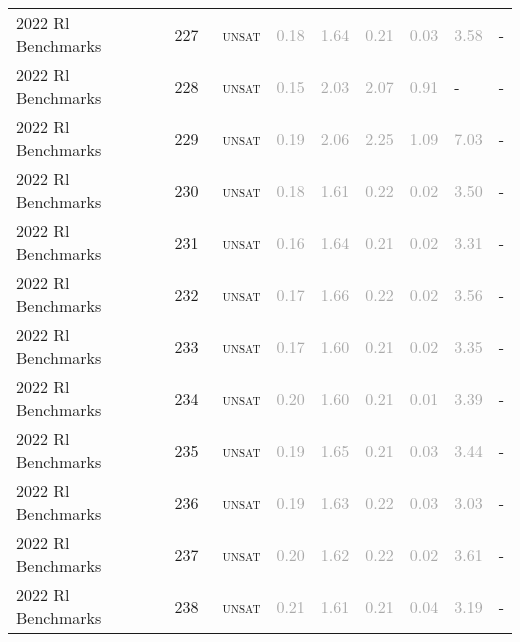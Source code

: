 \begin{center}
{\begin{longtable}{@{}lllllllll@{}}
2022 Rl Benchmarks & 227 & ~\textsc{unsat} & \textcolor{darkgray}{0.18} & \textcolor{darkgray}{1.64} & \textcolor{darkgray}{0.21} & \textcolor{darkgray}{0.03} & \textcolor{darkgray}{3.58} & - \\
2022 Rl Benchmarks & 228 & ~\textsc{unsat} & \textcolor{darkgray}{0.15} & \textcolor{darkgray}{2.03} & \textcolor{darkgray}{2.07} & \textcolor{darkgray}{0.91} & - & - \\
2022 Rl Benchmarks & 229 & ~\textsc{unsat} & \textcolor{darkgray}{0.19} & \textcolor{darkgray}{2.06} & \textcolor{darkgray}{2.25} & \textcolor{darkgray}{1.09} & \textcolor{darkgray}{7.03} & - \\
2022 Rl Benchmarks & 230 & ~\textsc{unsat} & \textcolor{darkgray}{0.18} & \textcolor{darkgray}{1.61} & \textcolor{darkgray}{0.22} & \textcolor{darkgray}{0.02} & \textcolor{darkgray}{3.50} & - \\
2022 Rl Benchmarks & 231 & ~\textsc{unsat} & \textcolor{darkgray}{0.16} & \textcolor{darkgray}{1.64} & \textcolor{darkgray}{0.21} & \textcolor{darkgray}{0.02} & \textcolor{darkgray}{3.31} & - \\
2022 Rl Benchmarks & 232 & ~\textsc{unsat} & \textcolor{darkgray}{0.17} & \textcolor{darkgray}{1.66} & \textcolor{darkgray}{0.22} & \textcolor{darkgray}{0.02} & \textcolor{darkgray}{3.56} & - \\
2022 Rl Benchmarks & 233 & ~\textsc{unsat} & \textcolor{darkgray}{0.17} & \textcolor{darkgray}{1.60} & \textcolor{darkgray}{0.21} & \textcolor{darkgray}{0.02} & \textcolor{darkgray}{3.35} & - \\
2022 Rl Benchmarks & 234 & ~\textsc{unsat} & \textcolor{darkgray}{0.20} & \textcolor{darkgray}{1.60} & \textcolor{darkgray}{0.21} & \textcolor{darkgray}{0.01} & \textcolor{darkgray}{3.39} & - \\
2022 Rl Benchmarks & 235 & ~\textsc{unsat} & \textcolor{darkgray}{0.19} & \textcolor{darkgray}{1.65} & \textcolor{darkgray}{0.21} & \textcolor{darkgray}{0.03} & \textcolor{darkgray}{3.44} & - \\
2022 Rl Benchmarks & 236 & ~\textsc{unsat} & \textcolor{darkgray}{0.19} & \textcolor{darkgray}{1.63} & \textcolor{darkgray}{0.22} & \textcolor{darkgray}{0.03} & \textcolor{darkgray}{3.03} & - \\
2022 Rl Benchmarks & 237 & ~\textsc{unsat} & \textcolor{darkgray}{0.20} & \textcolor{darkgray}{1.62} & \textcolor{darkgray}{0.22} & \textcolor{darkgray}{0.02} & \textcolor{darkgray}{3.61} & - \\
2022 Rl Benchmarks & 238 & ~\textsc{unsat} & \textcolor{darkgray}{0.21} & \textcolor{darkgray}{1.61} & \textcolor{darkgray}{0.21} & \textcolor{darkgray}{0.04} & \textcolor{darkgray}{3.19} & - \\

\end{longtable}}
\end{center}
